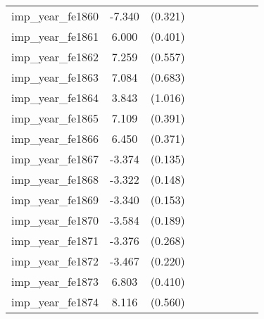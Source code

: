 {\begin{tabular}{l*{4}{cc}}
imp\_year\_fe1860&   -7.340\sym{***}&  (0.321)&                  &         &                  &         &                  &         \\
imp\_year\_fe1861&    6.000\sym{***}&  (0.401)&                  &         &                  &         &                  &         \\
imp\_year\_fe1862&    7.259\sym{***}&  (0.557)&                  &         &                  &         &                  &         \\
imp\_year\_fe1863&    7.084\sym{***}&  (0.683)&                  &         &                  &         &                  &         \\
imp\_year\_fe1864&    3.843\sym{***}&  (1.016)&                  &         &                  &         &                  &         \\
imp\_year\_fe1865&    7.109\sym{***}&  (0.391)&                  &         &                  &         &                  &         \\
imp\_year\_fe1866&    6.450\sym{***}&  (0.371)&                  &         &                  &         &                  &         \\
imp\_year\_fe1867&   -3.374\sym{***}&  (0.135)&                  &         &                  &         &                  &         \\
imp\_year\_fe1868&   -3.322\sym{***}&  (0.148)&                  &         &                  &         &                  &         \\
imp\_year\_fe1869&   -3.340\sym{***}&  (0.153)&                  &         &                  &         &                  &         \\
imp\_year\_fe1870&   -3.584\sym{***}&  (0.189)&                  &         &                  &         &                  &         \\
imp\_year\_fe1871&   -3.376\sym{***}&  (0.268)&                  &         &                  &         &                  &         \\
imp\_year\_fe1872&   -3.467\sym{***}&  (0.220)&                  &         &                  &         &                  &         \\
imp\_year\_fe1873&    6.803\sym{***}&  (0.410)&                  &         &                  &         &                  &         \\
imp\_year\_fe1874&    8.116\sym{***}&  (0.560)&                  &         &                  &         &                  &         \\

\end{tabular}}
